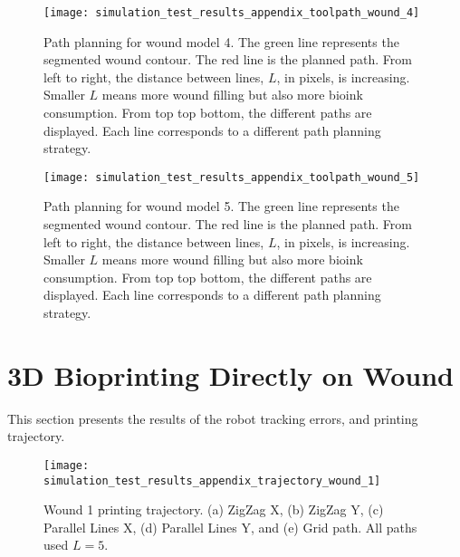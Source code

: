 \begin{figure}[htbp]
	\centering
	\texttt{[image: simulation\_test\_results\_appendix\_toolpath\_wound\_4]}
	\caption[Path planning for wound model 4.]{Path planning for wound model 4. The green line represents the segmented wound contour. The red line is the planned path. From left to right, the distance between lines, $L$, in pixels, is increasing. Smaller $L$ means more wound filling but also more bioink consumption. From top top bottom, the different paths are displayed. Each line corresponds to a different path planning strategy.}
	\label{fig:simulation_test_results_appendix_toolpath_wound_4}
\end{figure}

\begin{figure}[htbp]
	\centering
	\texttt{[image: simulation\_test\_results\_appendix\_toolpath\_wound\_5]}
	\caption[Path planning for wound model 5.]{Path planning for wound model 5. The green line represents the segmented wound contour. The red line is the planned path. From left to right, the distance between lines, $L$, in pixels, is increasing. Smaller $L$ means more wound filling but also more bioink consumption. From top top bottom, the different paths are displayed. Each line corresponds to a different path planning strategy.}
	\label{fig:simulation_test_results_appendix_toolpath_wound_5}
\end{figure}


\clearpage

\section{3D Bioprinting Directly on Wound}
\label{sec:simulation_test_results_appendix_bioprinting_directly_wound}

This section presents the results of the robot tracking errors, and printing trajectory.

\begin{figure}[htbp]
	\centering
	\texttt{[image: simulation\_test\_results\_appendix\_trajectory\_wound\_1]}
	\caption[Wound 1 printing trajectory.]{Wound 1 printing trajectory. (a) ZigZag X, (b) ZigZag Y, (c) Parallel Lines X, (d) Parallel Lines Y, and (e) Grid path. All paths used $L = 5$.}
    \label{fig:simulation_test_results_appendix_trajectory_wound_1}
\end{figure}

